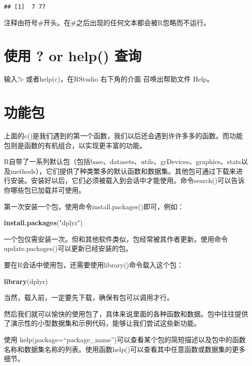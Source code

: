 \documentclass[]{book}
\newenvironment{Shaded}{\begin{snugshade}}{\end{snugshade}}
\newcommand{\KeywordTok}[1]{\textcolor[rgb]{0.13,0.29,0.53}{\textbf{#1}}}
\newcommand{\NormalTok}[1]{#1}
\newcommand{\StringTok}[1]{\textcolor[rgb]{0.31,0.60,0.02}{#1}}
\begin{document}
\begin{verbatim}
## [1]  7 77
\end{verbatim}

注释由符号\#开头。在\#之后出现的任何文本都会被R忽略而不运行。

\hypertarget{-or-help-}{%
\section{使用 ? or help() 查询}\label{-or-help-}}

输入?c 或者help(c)，在RStudio 右下角的介面 召唤出帮助文件 Help。

\section{功能包}

上面的c()是我们遇到的第一个函数，我们以后还会遇到许许多多的函数。而功能包则是函数的有机组合，以实现更丰富的功能。

R自带了一系列默认包（包括base、datasets、utils、grDevices、graphics、stats以及methods），它们提供了种类繁多的默认函数和数据集。其他包可通过下载来进行安装。安装好以后，它们必须被载入到会话中才能使用。命令search()可以告诉你哪些包已加载并可使用。

第一次安装一个包，使用命令install.packages()即可，例如：

\begin{Shaded}
\begin{Highlighting}[]
\KeywordTok{install.packages}\NormalTok{(}\StringTok{"dplyr"}\NormalTok{)}
\end{Highlighting}
\end{Shaded}

一个包仅需安装一次。但和其他软件类似，包经常被其作者更新。使用命令update.packages()可以更新已经安装的包。

要在R会话中使用包，还需要使用library()命令载入这个包：

\begin{Shaded}
\begin{Highlighting}[]
\KeywordTok{library}\NormalTok{(dplyr)}
\end{Highlighting}
\end{Shaded}

当然，载入前，一定要先下载，确保有包可以调用才行。

然后我们就可以愉快的使用包了，具体来说里面的各种函数和数据。包中往往提供了演示性的小型数据集和示例代码，能够让我们尝试这些新功能。

使用
help(package=``package\_name'')可以查看某个包的简短描述以及包中的函数名称和数据集名称的列表。使用函数help()可以查看其中任意函数或数据集的更多细节。
\end{document}
